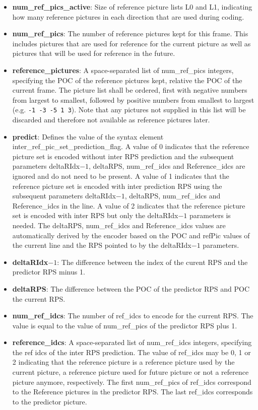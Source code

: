 \documentclass[a4paper,11pt]{jvetdoc}
\begin{document}
\begin{itemize}
\item[]\textbf{num_ref_pics_active}: Size of reference picture lists L0
and L1, indicating how many reference pictures in each direction that
are used during coding.

\item[]\textbf{num_ref_pics}: The number of reference pictures kept for
this frame.  This includes pictures that are used for reference for the
current picture as well as pictures that will be used for reference in
the future.

\item[]\textbf{reference_pictures}: A space-separated list of
num_ref_pics integers, specifying the POC of the reference pictures
kept, relative the POC of the current frame. The picture list shall be
ordered, first with negative numbers from largest to smallest, followed
by positive numbers from smallest to largest (e.g. \verb|-1 -3 -5 1 3|).
Note that any pictures not supplied in this list will be discarded and
therefore not available as reference pictures later.

\item[]\textbf{predict}: Defines the value of the syntax element
inter_ref_pic_set_prediction_flag. A value of 0 indicates that the
reference picture set is encoded without inter RPS prediction and the
subsequent parameters deltaRIdx$-1$, deltaRPS, num_ref_idcs and
Reference_idcs are ignored and do not need to be present. A value of 1
indicates that the reference picture set is encoded with inter
prediction RPS using the subsequent parameters deltaRIdx$-1$, deltaRPS,
num_ref_idcs and Reference_idcs in the line. A value of 2 indicates that
the reference picture set is encoded with inter RPS but only the
deltaRIdx$-1$ parameters is needed. The deltaRPS, num_ref_idcs and
Reference_idcs values are automatically derived by the encoder based on
the POC and refPic values of the current line and the RPS pointed to by
the deltaRIdx$-1$ parameters.

\item[]\textbf{deltaRIdx$-1$}: The difference between the index of the
curent RPS and the predictor RPS minus 1.

\item[]\textbf{deltaRPS}: The difference between the POC of the
predictor RPS and POC the current RPS.

\item[]\textbf{num_ref_idcs}: The number of ref_idcs to encode for the
current RPS.  The value is equal to the value of  num_ref_pics of the
predictor RPS plus 1.

\item[]\textbf{reference_idcs}: A space-separated list of num_ref_idcs
integers, specifying the ref idcs of the inter RPS prediction. The value
of ref_idcs may be 0, 1 or 2 indicating that the reference picture is a
reference picture used by the current picture, a reference picture used
for future picture or not a reference picture anymore, respectively. The
first num_ref_pics of ref_idcs correspond to the Reference pictures in
the predictor RPS. The last ref_idcs corresponds to the predictor
picture.
\end{itemize}
\end{document}
